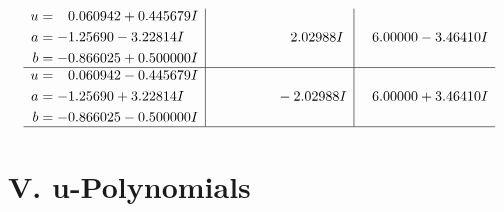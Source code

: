 \documentclass[1p]{elsarticle_modified}
\theoremstyle{definition}
\begin{document}
$$\begin{array}{c|c|c}
\begin{aligned}
u &= \phantom{-}0.060942 + 0.445679 I \\
a &= -1.25690 - 3.22814 I \\
b &= -0.866025 + 0.500000 I\end{aligned}
 & \phantom{-0.000000 -}2.02988 I & \phantom{-}6.00000 - 3.46410 I \\ \hline\begin{aligned}
u &= \phantom{-}0.060942 - 0.445679 I \\
a &= -1.25690 + 3.22814 I \\
b &= -0.866025 - 0.500000 I\end{aligned}
 & \phantom{-0.000000 } -2.02988 I & \phantom{-}6.00000 + 3.46410 I\\
 \hline 
 \end{array}$$\newpage
\newpage\renewcommand{\arraystretch}{1}
\centering \section*{ V. u-Polynomials}
\end{document}
